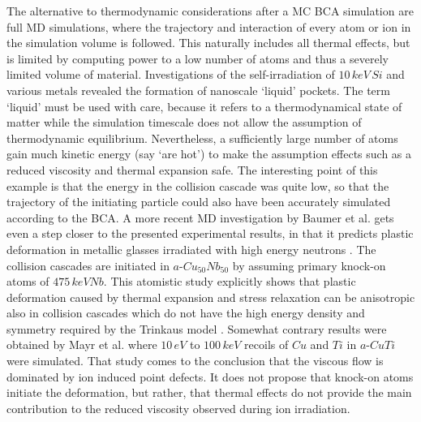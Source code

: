 \begin{Figure}[h]
The alternative to thermodynamic considerations after a MC BCA simulation are full MD simulations, where the trajectory and interaction of every atom or ion in the simulation volume is followed. This naturally includes all thermal effects, but is limited by computing power to a low number of atoms and thus a severely limited volume of material. Investigations of the self-irradiation of $10\,keV\,Si$ and various metals \cite{nordlund_defect_1998} revealed the formation of nanoscale `liquid' pockets. The term `liquid' must be used with care, because it refers to a thermodynamical state of matter while the simulation timescale does not allow the assumption of thermodynamic equilibrium. Nevertheless, a sufficiently large number of atoms gain much kinetic energy (say `are hot') to make the assumption effects such as a reduced viscosity and thermal expansion safe. The interesting point of this example is that the energy in the collision cascade was quite low, so that the trajectory of the initiating particle could also have been accurately simulated according to the BCA. A more recent MD investigation by Baumer et al. gets even a step closer to the presented experimental results, in that it predicts plastic deformation in metallic glasses irradiated with high energy neutrons \cite{baumer_prediction_2014}. The collision cascades are initiated in $a$-$Cu_{50}Nb_{50}$ by assuming primary knock-on atoms of $475\,keV Nb$. This atomistic study explicitly shows that plastic deformation caused by thermal expansion and stress relaxation can be anisotropic also in collision cascades which do not have the high energy density and symmetry required by the Trinkaus model \cite{trinkaus_viscoelastic_1995}. Somewhat contrary results were obtained by Mayr et al. \cite{mayr_mechanisms_2003} where $10\,eV$ to $100\,keV$ recoils of $Cu$ and $Ti$ in $a$-$CuTi$ were simulated. That study comes to the conclusion that the viscous flow is dominated by ion induced point defects. It does not propose that knock-on atoms initiate the deformation, but rather, that thermal effects do not provide the main contribution to the reduced viscosity observed during ion irradiation.



\end{Figure}
